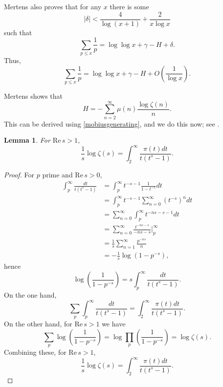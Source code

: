 \documentclass{amsart}
\def\Re{\ensuremath{\mathrm{Re}}\,}
\newtheorem{lemma}[theorem]{Lemma}
\begin{document}
Mertens \cite{mertens} also proves that for any $x$ there is some 
\[
|\delta|< \frac{4}{\log(x+1)} + \frac{2}{x\log x}
\]
such that
\[
\sum_{p \leq x} \frac{1}{p} = \log \log x + \gamma - H + \delta.
\]
Thus,
\[
\sum_{p \leq x} \frac{1}{p} = \log \log x + \gamma - H + O\left( \frac{1}{\log x} \right).
\]

Mertens shows that 
\[
H=-\sum_{n=2}^\infty \mu(n) \frac{\log \zeta(n)}{n}.
\]
This can be derived using \eqref{mobiusgenerating}, and we do this now; see \cite{lindqvist}.

\begin{lemma}
For $\Re s>1$,
\[
\frac{1}{s} \log \zeta(s) = \int_2^\infty \frac{\pi(t) dt}{t(t^s-1)}.
\]
\label{logzetalemma}
\end{lemma}
\begin{proof}
For $p$ prime and $\Re s>0$,
\begin{align*}
\int_p^\infty \frac{dt}{t(t^s-1)}&=
\int_p^\infty t^{-s-1}\frac{1}{1-t^{-s}} dt\\
&=\int_p^\infty t^{-s-1} \sum_{n=0}^\infty (t^{-s})^n dt\\
&=\sum_{n=0}^\infty \int_p^\infty t^{-ns-s-1} dt\\
&=\sum_{n=0}^\infty \frac{t^{-ns-s}}{-ns-s} \bigg|_p^\infty\\
&=\frac{1}{s} \sum_{n=1}^\infty \frac{p^{-ns}}{n}\\
&=-\frac{1}{s} \log(1-p^{-s}),
\end{align*}
hence
\[
 \log \left( \frac{1}{1-p^{-s}} \right) = s  \int_p^\infty \frac{dt}{t(t^s-1)}.
\]
On the one hand,
\[
\sum_p  \int_p^\infty \frac{dt}{t(t^s-1)} = \int_2^\infty \frac{\pi(t) dt}{t(t^s-1)}.
\]
On the other hand, for $\Re s>1$ we have
\[
\sum_p  \log \left( \frac{1}{1-p^{-s}} \right) = \log \prod_p  \left( \frac{1}{1-p^{-s}} \right)
=\log \zeta(s). 
\]
Combining these, for $\Re s>1$,
\[
\frac{1}{s} \log \zeta(s) = \int_2^\infty \frac{\pi(t) dt}{t(t^s-1)}.
\]
\end{proof}
\end{document}
